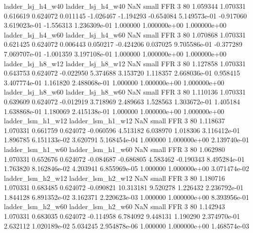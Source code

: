        ladder_lsj_h4_w40        ladder_lsj_h4_w40                   NaN      small      FFR                 3 80 1.059344       1.070331 0.616619       0.624072    0.011145     -1.026467     -1.194293    -0.654084   5.149573e-01 -0.917060 3.619023e-01    -1.556313   1.236309e-01            1.000000    1.000000e+00        1.000000e+00
       ladder_lsj_h4_w60        ladder_lsj_h4_w60                   NaN      small      FFR                 3 80 1.070868       1.070331 0.621425       0.624072    0.006443      0.050217     -0.424206     0.037025   9.705586e-01 -0.377289 7.069707e-01    -1.001359   3.197108e-01            1.000000    1.000000e+00        1.000000e+00
       ladder_lsj_h8_w12        ladder_lsj_h8_w12                   NaN      small      FFR                 3 80 1.127858       1.070331 0.643753       0.624072   -0.022950      5.374688      3.153720     1.118357   2.668036e-01  0.958415 3.407774e-01     1.161820   2.488068e-01            1.000000    1.000000e+00        1.000000e+00
       ladder_lsj_h8_w60        ladder_lsj_h8_w60                   NaN      small      FFR                 3 80 1.110136       1.070331 0.639609       0.624072   -0.012919      3.718969      2.489663     1.528563   1.303672e-01  1.405184 1.638868e-01     1.180069   2.415138e-01            1.000000    1.000000e+00        1.000000e+00
       ladder_lsm_h1_w12        ladder_lsm_h1_w12                   NaN      small      FFR                 3 80 1.118637       1.070331 0.661759       0.624072   -0.060596      4.513182      6.038970     1.018306   3.116412e-01  1.896785 6.151133e-02     3.620791   5.168454e-04            1.000000    1.000000e+00        2.139740e-01
       ladder_lsm_h1_w60        ladder_lsm_h1_w60                   NaN      small      FFR                 3 80 1.062980       1.070331 0.652676       0.624072   -0.084687     -0.686805      4.583462    -0.190343   8.495284e-01  1.763820 8.162846e-02     4.203941   6.855969e-05            1.000000    1.000000e+00        3.071474e-02
       ladder_lsm_h2_w12        ladder_lsm_h2_w12                   NaN      small      FFR                 3 80 1.180716       1.070331 0.683485       0.624072   -0.090821     10.313181      9.520278     1.226432   2.236792e-01  1.844128 6.891352e-02     3.162371   2.220623e-03            1.000000    1.000000e+00        8.393956e-01
       ladder_lsm_h2_w60        ladder_lsm_h2_w60                   NaN      small      FFR                 3 80 1.142943       1.070331 0.683035       0.624072   -0.114958      6.784092      9.448131     1.190290   2.374970e-01  2.632112 1.020189e-02     5.034245   2.954878e-06            1.000000    1.000000e+00        1.468574e-03
